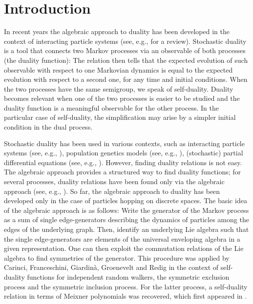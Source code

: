 \documentclass[pdftex]{sigma}
\numberwithin{equation}{section}
\newcommand{\1}{\mathbbm{1}}
\begin{document}
\section{Introduction}

In recent years the algebraic approach to duality has been developed in the context of interacting particle systems (see, e.g., \cite{sturm2020algebraic} for a review). Stochastic duality is a tool that connects two Markov processes via an observable of both processes (the duality function): The relation then tells that the expected evolution of such observable with respect to one Markovian dynamics is equal to the expected evolution with respect to a second one, for any time and initial conditions. When the two processes have the same semigroup, we speak of self-duality. Duality becomes relevant when one of the two processes is easier to be studied and the duality function is a meaningful observable for the other process. In the particular case of self-duality, the simplification may arise by a simpler initial condition in the dual process.

 Stochastic duality has been used in various contexts, such as interacting particle systems (see, e.g., \cite{liggett_interacting_2005}), population genetics models (see, e.g., \cite{etheridige06}), (stochastic) partial differential equations (see, e.g., \cite{Mueller15}). However, finding duality relations is not easy. The algebraic approach provides
a structured way to find duality functions; for several processes, duality relations have been found only via the algebraic approach (see, e.g., \cite{carinci2016asymmetric,carinci3367generalized,kuan2016stochastic,kuan2018algebraic}).
So far, the algebraic approach to duality has been developed only in the case of particles hopping on discrete spaces.
The basic idea of the algebraic approach is as follows: Write the generator of the Markov process as a sum of single edge-generators describing the dynamics of particles among the edges of the underlying graph. Then, identify an underlying Lie algebra such that the single edge-generators are elements of the universal enveloping algebra in a given representation. One can then exploit the commutation relations of the Lie algebra to find symmetries of the generator.
This procedure was applied by Carinci, Franceschini, Giardin\`a, Groenevelt and Redig in the context of self-duality functions for independent random walkers, the symmetric exclusion process and the symmetric inclusion process. For the latter process, a self-duality relation in terms of Meixner polynomials was recovered, which first appeared in \cite{franceschini2019stochastic}.
\end{document}
